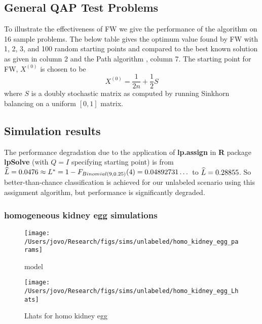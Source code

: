 \subsection{General QAP Test Problems}
To illustrate the effectiveness of FW 
we give the performance of the algorithm on 16 sample problems.  The below table gives the optimum value found by FW with 1, 2, 3, and 100 random starting points   and compared 
to the best known solution as given in column 2 and the Path algorithm  \cite{Path:2009}, column 7.   The starting point for FW, $X^{(0)}$ is chosen to be
$$X^{(0)}=\frac {1}{2n} + \frac{1}{2} S$$
where $S$ is a doubly stochastic matrix as computed by running Sinkhorn balancing on a uniform $[0,1]$ matrix.



\subsection{Simulation results} %
\label{sub:simulation_results}

The performance degradation due to the application of {\bf lp.assign} in {\bf R} package {\bf lpSolve} (with $Q=I$ specifying starting point) is
from $\widehat{L} = 0.0476 \approx L^* = 1-F_{Binomial(9,0.25)}(4) = 0.04892731\dots$ to $\widehat{L} = 0.28855$. So better-than-chance classification is
achieved for our unlabeled scenario using this assignment algorithm, but performance is significantly degraded.


\subsubsection{homogeneous kidney egg simulations} %
\label{ssub:homogeneous_kidney_egg_simulations}


\begin{figure}[htbp]
	\centering		\texttt{[image: /Users/jovo/Research/figs/sims/unlabeled/homo\_kidney\_egg\_params]}
	\caption{model}
	\label{fig:models}
\end{figure}

\begin{figure}[htbp]
	\centering			\texttt{[image: /Users/jovo/Research/figs/sims/unlabeled/homo\_kidney\_egg\_Lhats]}
	\caption{Lhats for homo kidney egg}
	\label{fig:figs_Sims_unlabeled_LPvsFW500}
\end{figure}


